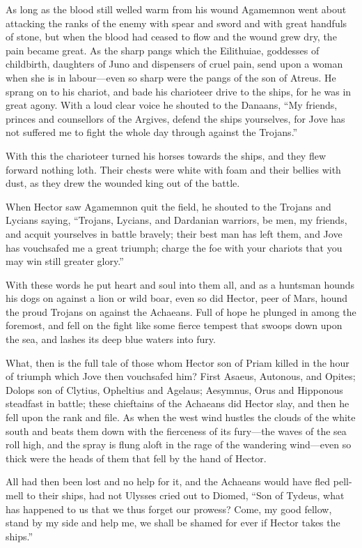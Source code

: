 As long as the blood still welled warm from his wound Agamemnon went about
attacking the ranks of the enemy with spear and sword and with great
handfuls of stone, but when the blood had ceased to flow and the wound
grew dry, the pain became great. As the sharp pangs which the Eilithuiae,
goddesses of childbirth, daughters of Juno and dispensers of cruel pain,
send upon a woman when she is in labour—even so sharp were the pangs
of the son of Atreus. He sprang on to his chariot, and bade his charioteer
drive to the ships, for he was in great agony. With a loud clear voice he
shouted to the Danaans, “My friends, princes and counsellors of the
Argives, defend the ships yourselves, for Jove has not suffered me to
fight the whole day through against the Trojans.”

With this the charioteer turned his horses towards the ships, and they
flew forward nothing loth. Their chests were white with foam and their
bellies with dust, as they drew the wounded king out of the battle.

When Hector saw Agamemnon quit the field, he shouted to the Trojans and
Lycians saying, “Trojans, Lycians, and Dardanian warriors, be men, my
friends, and acquit yourselves in battle bravely; their best man has left
them, and Jove has vouchsafed me a great triumph; charge the foe with your
chariots that you may win still greater glory.”

With these words he put heart and soul into them all, and as a huntsman
hounds his dogs on against a lion or wild boar, even so did Hector, peer
of Mars, hound the proud Trojans on against the Achaeans. Full of hope he
plunged in among the foremost, and fell on the fight like some fierce
tempest that swoops down upon the sea, and lashes its deep blue waters
into fury.

What, then is the full tale of those whom Hector son of Priam killed in
the hour of triumph which Jove then vouchsafed him? First Asaeus,
Autonous, and Opites; Dolops son of Clytius, Opheltius and Agelaus;
Aesymnus, Orus and Hipponous steadfast in battle; these chieftains of the
Achaeans did Hector slay, and then he fell upon the rank and file. As when
the west wind hustles the clouds of the white south and beats them down
with the fierceness of its fury—the waves of the sea roll high, and
the spray is flung aloft in the rage of the wandering wind—even so
thick were the heads of them that fell by the hand of Hector.

All had then been lost and no help for it, and the Achaeans would have
fled pell-mell to their ships, had not Ulysses cried out to Diomed, “Son
of Tydeus, what has happened to us that we thus forget our prowess? Come,
my good fellow, stand by my side and help me, we shall be shamed for ever
if Hector takes the ships.”

